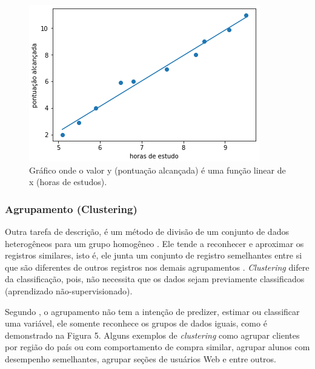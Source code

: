 \begin{figure}[!htp]
	\begin{center}
    \caption{\label{fig:waveform_fig} Gráfico onde o valor y (pontuação alcançada) é uma função linear de x (horas de estudos).}
	\includegraphics[scale=0.99]{Figuras/Regressao_linear.png}
	\end{center}
\end{figure}

\subsubsection{Agrupamento (Clustering)}

\par
Outra tarefa de descrição, é um método de divisão de um conjunto de dados heterogêneos para um grupo homogêneo \cite{LeandroSilva2014}. Ele tende a reconhecer e aproximar os registros similares, isto é, ele junta um conjunto de registro semelhantes entre si que são diferentes de outros registros nos demais agrupamentos \cite{Camilo2009}. \textit{Clustering} difere da classificação, pois, não necessita que os dados sejam previamente classificados (aprendizado não-supervisionado).

\par
Segundo \cite{Camilo2009}, o agrupamento não tem a intenção de predizer, estimar ou classificar uma variável, ele somente reconhece os grupos de dados iguais, como é demonstrado na Figura 5. Alguns exemplos de \textit{clustering} como agrupar clientes por região do país ou com comportamento de compra similar, agrupar alunos com desempenho semelhantes, agrupar seções de usuários Web e entre outros.


